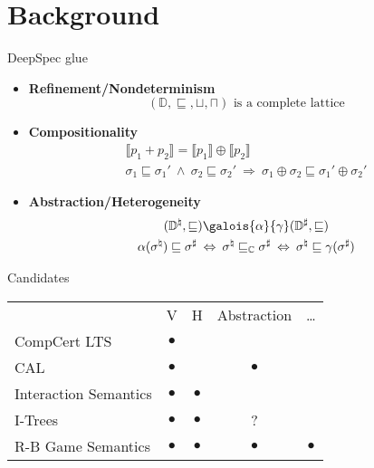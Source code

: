 \documentclass{beamer}
\begin{document}
\section{Background}

\begin{frame}{DeepSpec glue} %
\end{frame}

\begin{frame} %
\begin{center}
\end{center}
\begin{itemize}
\item \textbf{Refinement/Nondeterminism}
  \[ (\mathbb{D}, {\sqsubseteq}, {\sqcup}, {\sqcap})
     \mbox{ is a complete lattice} \]
\item \textbf{Compositionality}
  \begin{gather*}
    \llbracket p_1 + p_2 \rrbracket =
    \llbracket p_1 \rrbracket \oplus \llbracket p_2 \rrbracket
    \\
    \sigma_1 \sqsubseteq \sigma_1' \:\wedge\:
    \sigma_2 \sqsubseteq \sigma_2' \:\Rightarrow\:
    \sigma_1 \oplus \sigma_2 \sqsubseteq \sigma_1' \oplus \sigma_2'
  \end{gather*}
\item \textbf{Abstraction/Heterogeneity}
  \begin{gather*}
    (\mathbb{D}^\natural, {\sqsubseteq})
    \galois{\alpha}{\gamma}
    (\mathbb{D}^\sharp, {\sqsubseteq})
    \\
    \alpha(\sigma^\natural) \sqsubseteq \sigma^\sharp
    \: \Leftrightarrow \:
    \sigma^\natural \sqsubseteq_\mathbb{C} \sigma^\sharp
    \: \Leftrightarrow \:
    \sigma^\natural \sqsubseteq \gamma(\sigma^\sharp)
  \end{gather*}
\end{itemize}
\end{frame}

\begin{frame}{Candidates} %
\begin{center}
  \begin{tabular}{lcccc}
                 & V & H & Abstraction & \ldots \\
    CompCert LTS & $\bullet$ &   & &  \\
    CAL & $\bullet$ & & $\bullet$ & \\
    Interaction Semantics & $\bullet$ & $\bullet$ & & \\
    I-Trees & $\bullet$ & $\bullet$ & ? & \\
    R-B Game Semantics & $\bullet$ & $\bullet$ & $\bullet$ & $\bullet$ \\
  \end{tabular}
\end{center}
\end{frame}
\end{document}
